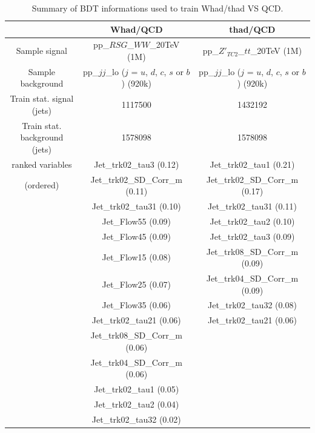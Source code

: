 \documentclass{cernrep}
\begin{document}
\begin{table}[!htb]\centering
\begin{tabular}{|c|c|c|}
\hline
\hline			
 & Whad/QCD & thad/QCD \\
\hline                        
Sample signal     & pp\_$RSG$\_$WW$\_20TeV (1M) & pp\_$Z'_{TC2}$\_$tt$\_20TeV (1M) \\
Sample background & pp\_$jj$\_lo ($j$ = $u$, $d$, $c$, $s$ or $b$) (920k) & pp\_$jj$\_lo ($j$ = $u$, $d$, $c$, $s$ or $b$) (920k)               \\
\hline
Train stat. signal (jets)     & 1117500 & 1432192 \\
Train stat. background (jets) & 1578098 & 1578098 \\
\hline
ranked variables & Jet\_trk02\_tau3 (0.12)        & Jet\_trk02\_tau1 (0.21) \\
(ordered)        & Jet\_trk02\_SD\_Corr\_m (0.11) & Jet\_trk02\_SD\_Corr\_m (0.17) \\
                 & Jet\_trk02\_tau31 (0.10)       & Jet\_trk02\_tau31 (0.11) \\
                 & Jet\_Flow55 (0.09)             & Jet\_trk02\_tau2 (0.10) \\
                 & Jet\_Flow45 (0.09)             & Jet\_trk02\_tau3 (0.09) \\
                 & Jet\_Flow15 (0.08)             & Jet\_trk08\_SD\_Corr\_m (0.09) \\
                 & Jet\_Flow25 (0.07)             & Jet\_trk04\_SD\_Corr\_m (0.09) \\
                 & Jet\_Flow35 (0.06)             & Jet\_trk02\_tau32 (0.08) \\
                 & Jet\_trk02\_tau21 (0.06)       & Jet\_trk02\_tau21 (0.06) \\
                 & Jet\_trk08\_SD\_Corr\_m (0.06) &  \\
                 & Jet\_trk04\_SD\_Corr\_m (0.06) &  \\
                 & Jet\_trk02\_tau1 (0.05)        &  \\
                 & Jet\_trk02\_tau2 (0.04)        &  \\
                 & Jet\_trk02\_tau32 (0.02)       &  \\
\hline
\hline
\end{tabular}
\caption{Summary of BDT informations used to train Whad/thad VS QCD.}
\label{tab:TMVA_summary}
\end{table}
\end{document}
